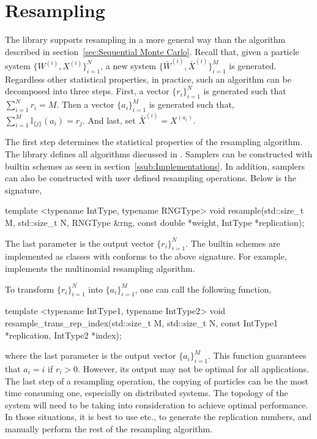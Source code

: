 \section{Resampling}
\label{sec:Resampling}

The library supports resampling in a more general way than the algorithm
described in section~\ref{sec:Sequential Monte Carlo}. Recall that, given a
particle system $\{W^{(i)},X^{(i)}\}_{i=1}^N$, a new system $\{\bar{W}^{(i)},
\bar{X}^{(i)}\}_{i=1}^M$ is generated. Regardless other statistical properties,
in practice, such an algorithm can be decomposed into three steps. First, a
vector $\{r_i\}_{i=1}^N$ is generated such that $\sum_{i=1}^N r_i = M$. Then a
vector $\{a_i\}_{i=1}^M$ is generated such that, $\sum_{i=1}^M
\mathbb{I}_{\{j\}}(a_i) = r_j$. And last, set $\bar{X}^{(i)} = X^{(a_i)}$.

The first step determines the statistical properties of the resampling
algorithm. The library defines all algorithms discussed in
\textcite{Douc:2005wa}. Samplers can be constructed with builtin schemes as
seen in section~\ref{ssub:Implementations}. In addition, samplers can also be
constructed with user defined resampling operations. Below is the signature,
\begin{cppcode}
  template <typename IntType, typename RNGType>
  void resample(std::size_t M, std::size_t N, RNGType &rng,
  const double *weight, IntType *replication);
\end{cppcode}
The last parameter is the output vector $\{r_i\}_{i=1}^N$. The builtin schemes
are implemented as classes with  conforms to the above
signature. For example,  implements the
multinomial resampling algorithm.

To transform $\{r_i\}_{i=1}^N$ into $\{a_i\}_{i=1}^M$, one can call the
following function,
\begin{cppcode}
  template <typename IntType1, typename IntType2>
  void resample_trans_rep_index(std::size_t M, std::size_t N,
  const IntType1 *replication, IntType2 *index);
\end{cppcode}
where the last parameter is the output vector $\{a_i\}_{i=1}^M$. This function
guarantees that $a_i = i$ if $r_i > 0$. However, its output may not be optimal
for all applications. The last step of a resampling operation, the copying of
particles can be the most time consuming one, especially on distributed
systems. The topology of the system will need to be taking into consideration
to achieve optimal performance. In those situations, it is best to use
 etc., to generate the replication numbers, and
manually perform the rest of the resampling algorithm.

